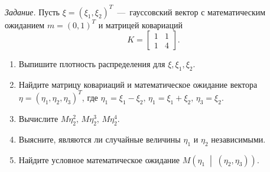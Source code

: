 \textit{Задание.}
Пусть
$ \xi = \left( \xi_1, \xi_2 \right)^T$~---~гауссовский вектор с математическим
ожиданием $m = \left( 0, 1 \right)^T$ и матрицей ковариаций
\begin{equation*}
  K =
  \begin{bmatrix}
    1 & 1 \\
    1 & 4
  \end{bmatrix}.
\end{equation*}
\begin{enumerate}[label=\alph*)]
  \item Выпишите плотность распределения для $ \xi, \xi_1, \xi_2$.
  \item Найдите матрицу ковариаций и математическое ожидание вектора
  $ \eta = \left( \eta_1, \eta_2, \eta_3 \right)^T$,
  где $ \eta_1 = \xi_1 - \xi_2, \, \eta_1 = \xi_1 + \xi_2, \, \eta_3 = \xi_2$.
  \item Вычислите $M \eta_2^2, \, M \eta_2^3, \, M \eta_2^4$.
  \item Выясните, являются ли случайные величины $ \eta_1 $ и $ \eta_2 $
  независимыми.
  \item Найдите условное математическое ожидание
  $M \left( \eta_1 \; \middle| \; \left( \eta_2, \eta_3 \right) \right) $.
\end{enumerate}

